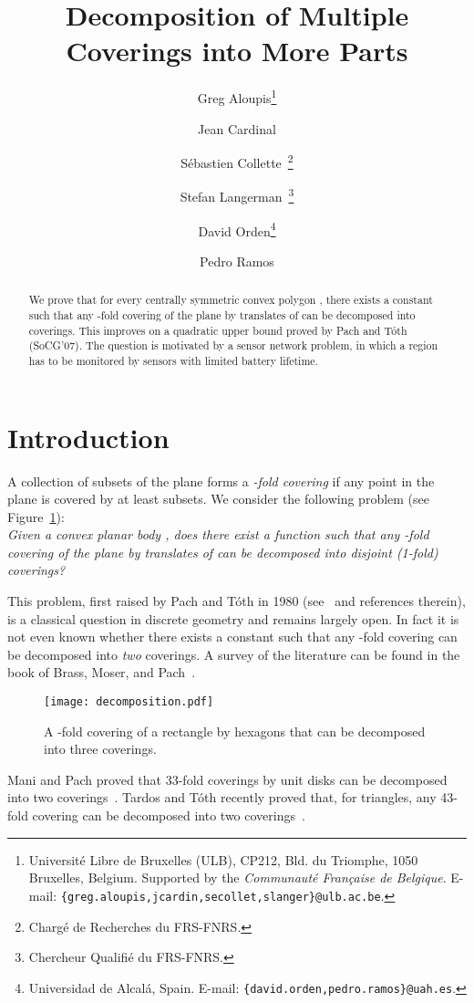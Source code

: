 \documentclass[english,11pt]{article}
\title{Decomposition of Multiple Coverings into More Parts}
\author{Greg Aloupis\thanks{Universit\'e Libre de Bruxelles (ULB), CP212, Bld. du Triomphe, 1050 Bruxelles, Belgium. Supported by the \emph{Communaut\'e Fran\c caise de Belgique}. E-mail: {\tt \{greg.aloupis,jcardin,secollet,slanger\}@ulb.ac.be}.} \and Jean Cardinal\footnotemark[1] \and  S\'ebastien Collette\footnotemark[1]~\thanks{Charg\'e de Recherches du FRS-FNRS.} \and Stefan Langerman\footnotemark[1]~\thanks{Chercheur Qualifi\'e du FRS-FNRS.} \and David Orden\thanks{Universidad de Alcal\'a, Spain. E-mail: {\tt \{david.orden,pedro.ramos\}@uah.es}.}  \and Pedro Ramos\footnotemark[4]}
\date{}
\begin{document}
\maketitle
\sloppy

\begin{abstract}
We prove that for every centrally symmetric convex polygon , there exists a constant  such that any -fold covering of the plane by
translates of  can be decomposed into  coverings. This improves on a quadratic upper bound proved by Pach and T\'oth (SoCG'07). The question is motivated by a sensor network problem, in which a region has to be monitored by sensors with limited battery lifetime.
\end{abstract}

\section{Introduction}

A collection of subsets of the plane forms a {\em -fold covering} if any point in the plane is covered by at least  subsets. We consider the following problem (see Figure~\ref{fig:decomp}):\\
{\em Given a convex planar body , does there exist a function  such that any -fold covering of the plane by translates of  can be decomposed into  disjoint (1-fold) coverings?}\medskip

This problem, first raised by Pach and T\'oth in 1980 (see~\cite{Pa80} and references therein), is  a classical question in discrete geometry and remains largely open. In fact it is not even known whether there exists a constant  such that any -fold covering  can be decomposed into {\em two} coverings. A survey of the literature can be found in the book of Brass, Moser, and Pach~\cite{RPDG}.\medskip

\begin{figure}[htb]
\begin{center}
\texttt{[image: decomposition.pdf]}
\end{center}
\caption{\label{fig:decomp}A -fold covering of a rectangle by hexagons that can be decomposed into three coverings.}
\end{figure}

Mani and Pach proved that 33-fold coverings by unit disks can be decomposed into two coverings~\cite{MP86}. Tardos and T\'{o}th recently proved that, for triangles, any 43-fold covering can be decomposed into two coverings~\cite{TT07}. 
\end{document}
